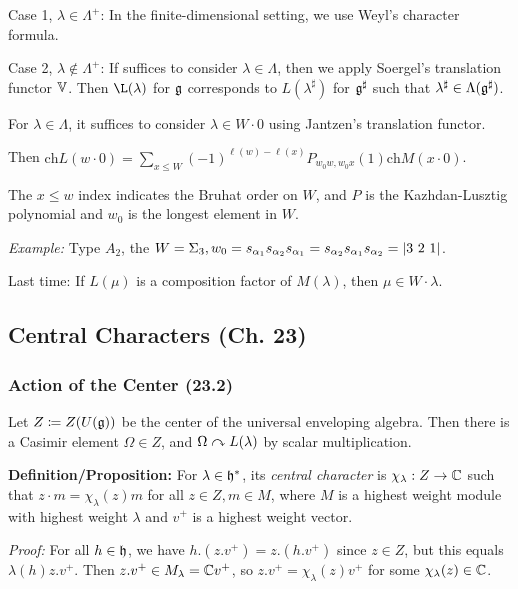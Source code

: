 Case 1, \(\lambda \in \Lambda^+\): In the finite-dimensional setting, we
use Weyl's character formula.

Case 2, \(\lambda \not\in\Lambda^+\): If suffices to consider
\(\lambda \in \Lambda\), then we apply Soergel's translation functor
\(\Bbb V\). Then \(\L(\lambda)\) for \({\mathfrak{g}}\) corresponds to
\(L(\lambda^\sharp)\) for \({\mathfrak{g}}^\sharp\) such that
\(\lambda^\sharp \in \Lambda({\mathfrak{g}}^\sharp)\).

For \(\lambda \in \Lambda\), it suffices to consider
\(\lambda \in W\cdot 0\) using Jantzen's translation functor.

Then
\(\mathrm{ch} L(w\cdot 0) = \sum_{x\leq W} (-1)^{\ell(w) - \ell(x)} P_{w_0w, w_0x}(1) \mathrm{ch}M(x\cdot 0)\).

The \(x\leq w\) index indicates the Bruhat order on \(W\), and \(P\) is
the Kazhdan-Lusztig polynomial and \(w_0\) is the longest element in
\(W\).

\emph{Example:} Type \(A_2\), the
\(W = \Sigma_3, w_0 = s_{\alpha_1} s_{\alpha_2} s_{\alpha_1} = s_{\alpha_2} s_{\alpha_1} s_{\alpha_2} = {\left\lvert {3~2~1} \right\rvert}\).

Last time: If \(L(\mu)\) is a composition factor of \(M(\lambda)\), then
\(\mu \in W\cdot \lambda\).

\hypertarget{central-characters-ch.-23}{%
\subsection{Central Characters (Ch.
23)}\label{central-characters-ch.-23}}

\hypertarget{action-of-the-center-23.2}{%
\subsubsection{Action of the Center
(23.2)}\label{action-of-the-center-23.2}}

Let \(Z \coloneqq Z(U({\mathfrak{g}}))\) be the center of the universal
enveloping algebra. Then there is a Casimir element \(\Omega \in Z\),
and \(\Omega \curvearrowright L(\lambda)\) by scalar multiplication.

\textbf{Definition/Proposition:} For \(\lambda \in {\mathfrak{h}}^*\), its
\emph{central character} is \(\chi_\lambda: Z \to {\mathbb{C}}\) such that
\(z\cdot m = \chi_\lambda(z)m\) for all \(z\in Z, m\in M\), where \(M\)
is a highest weight module with highest weight \(\lambda\) and \(v^+\)
is a highest weight vector.

\emph{Proof:} For all \(h\in {\mathfrak{h}}\), we have \(h.(z.v^+) = z.(h.v^+)\)
since \(z\in Z\), but this equals \(\lambda(h) z.v^+\). Then
\(z.v^+ \in M_\lambda = {\mathbb{C}} v^+\), so \(z.v^+ = \chi_\lambda(z) v^+\)
for some \(\chi_\lambda(z)\in {\mathbb{C}}\).

